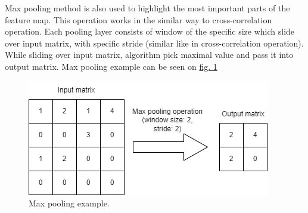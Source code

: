     Max pooling method is also used to highlight the most important parts of the feature map. This operation works in the similar way to cross-correlation operation. Each pooling layer consists of window of the specific size which slide over input matrix, with specific stride (similar like in cross-correlation operation). While sliding over input matrix, algorithm pick maximal value and pass it into output matrix. Max pooling example can be seen on \hyperref[fig:max-pooling-example]{fig. \ref*{fig:max-pooling-example}}
    \begin{figure}
        \centering
        \includegraphics[width=\textwidth]{dependencies/pictures/Max_Pooling_example.png}
        \caption{Max pooling example.}
        \label{fig:max-pooling-example}
    \end{figure}


